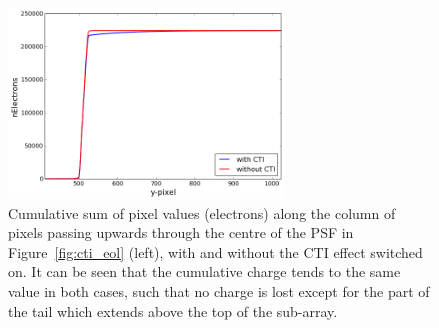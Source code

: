 \documentclass[11pt]{article}      %
\begin{document}
\begin{figure}[htbp]
  \begin{center}
    \includegraphics[width=0.65\textwidth]{cti_eol_profile.png}
    \caption{Cumulative sum of pixel values (electrons) along the column of pixels passing upwards through the centre of the PSF in Figure~\ref{fig:cti_eol} (left), with and without the CTI effect switched on. It can be seen that the cumulative charge tends to the same value in both cases, such that no charge is lost except for the part of the tail which extends above the top of the sub-array.}
    \label{fig:cti_eol_profile}
  \end{center}
\end{figure}
\end{document}
